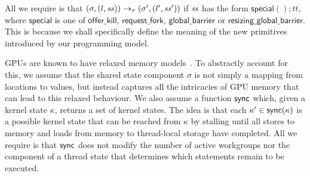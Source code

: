 \documentclass[parskip=half,sigconf,review, anonymous=true, acmcopyrightmode=none]{acmart}
\newcommand{\offerfork}{\mathsf{request\_fork}}
\newcommand{\offerkill}{\mathsf{offer\_kill}}
\newcommand{\globalbarrier}{\mathsf{global\_barrier}}
\newcommand{\resizingglobalbarrier}{\mathsf{resizing\_global\_barrier}}
\begin{document}
All we require is that $(\sigma, (l, \mathit{ss})) \rightarrow_{\tau}
(\sigma', (l', \mathit{ss}'))$ if $\mathit{ss}$ has the form $\mathsf{special}();
\mathit{tt}$, where $\mathsf{special}$ is one of $\offerkill$,
$\offerfork$, $\globalbarrier$ or $\resizingglobalbarrier$.  This is
because we shall specifically define the meaning of the new primitives
introduced by our programming model.

%
GPUs are known to have relaxed memory models~\cite{ABDGKPSW-2015}.  To abstractly
account for this, we assume that the shared state component $\sigma$
is not simply a mapping from locations to values, but instead
captures all the intricacies of GPU memory that can lead to this
relaxed behaviour.  We also assume a function $\mathsf{sync}$ which, given a
kernel state $\kappa$, returns a set of kernel states.  The idea is
that each $\kappa' \in \mathsf{sync}(\kappa)$ is a possible kernel state that
can be reached from $\kappa$ by stalling until all stores to memory
and loads from memory to thread-local storage have completed.  All we
require is that $\mathsf{sync}$ does not modify the number of active
workgroups nor the component of a thread state that determines which
statements remain to be executed.
\end{document}
